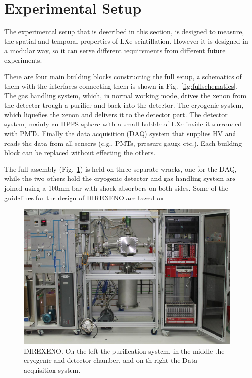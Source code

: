 \section{Experimental Setup}
\label{expSetup}


The experimental setup that is described in this section, is designed to measure, the spatial and temporal properties of LXe scintillation. However it is designed in a modular way, so it can serve different requirements from different future experiments. 

There are four main building blocks constructing the full setup, a schematics of them with the interfaces connecting them is shown in Fig.~\ref{fig:fullschematics}. The gas handling system, which, in normal working mode, drives the xenon from the detector trough a purifier and back into the detector. The cryogenic system, which liquefies the xenon and delivers it to the detector part. The detector system, mainly an HPFS sphere with a small bubble of LXe inside it surronded with PMTs. Finally the data acquisition (DAQ) system that supplies HV and reads the data from all sensors (e.g., PMTs, pressure gauge etc.). Each building block can be replaced without effecting the others. 

The full assembly (Fig.~\ref{fig:fulldet}) is held on three separate wracks, one for the DAQ, while the two others hold the cryogenic detector and gas handling system are joined using a 100mm bar with shock absorbers on both sides. Some of the guidelines for the design of DIREXENO are based on~\cite{Giboni}  

\begin{figure}[t!]
\centerline{\includegraphics[width=1.\linewidth]{FullDet.jpg}}
\caption{DIREXENO. On the left the purification system, in the middle the cryogenic and detector chamber, and on th right the Data acquisition system.}
\label{fig:fulldet}
\end{figure}

